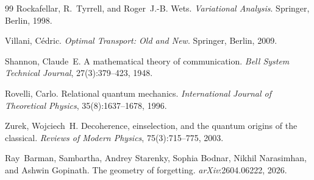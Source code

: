 \documentclass[12pt, oneside]{article}
\theoremstyle{plain}
\theoremstyle{definition}
\theoremstyle{remark}
\theoremstyle{definition}
\begin{document}
\begin{thebibliography}{99}
Rockafellar, R.~Tyrrell, and Roger~J.-B. Wets.
\newblock \emph{Variational Analysis}.
\newblock Springer, Berlin, 1998.

Villani, C\'edric.
\newblock \emph{Optimal Transport: Old and New}.
\newblock Springer, Berlin, 2009.

Shannon, Claude~E.
\newblock A mathematical theory of communication.
\newblock \emph{Bell System Technical Journal}, 27(3):379--423, 1948.

Rovelli, Carlo.
\newblock Relational quantum mechanics.
\newblock \emph{International Journal of Theoretical Physics},
  35(8):1637--1678, 1996.

Zurek, Wojciech~H.
\newblock Decoherence, einselection, and the quantum origins of the classical.
\newblock \emph{Reviews of Modern Physics}, 75(3):715--775, 2003.

Ray~Barman, Sambartha, Andrey Starenky, Sophia Bodnar, Nikhil Narasimhan,
  and Ashwin Gopinath.
\newblock The geometry of forgetting.
\newblock \emph{arXiv}:2604.06222, 2026.

\end{thebibliography}
\end{document}
